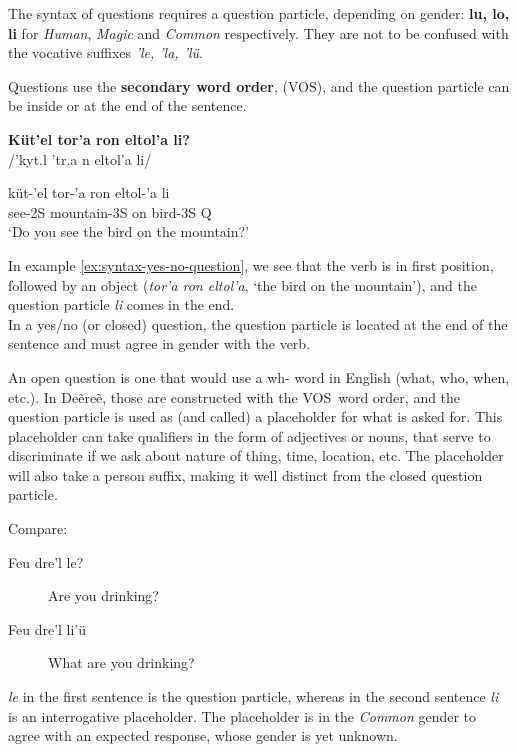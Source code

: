 The syntax of questions requires a question particle, depending on gender:
\textbf{lu, lo, li} for \emph{Human}, \emph{Magic} and \emph{Common} respectively.
They are not to be confused with the vocative suffixes \emph{’le, ’la, ’lü}.

Questions use the \textbf{secondary word order}, (VOS), and the question particle can be inside or at the end of the sentence.


\begin{exe}
\ex\label{ex:syntax-yes-no-question}
\textbf{Küt’el tor’a ron eltol’a li?}\\
/'kyt.{\ipaE}l 't{\ipaO\ipaR}r.a {\ipaR\ipaO}n eltol’a li/

\gll küt-’el tor-’a ron eltol-’a li\\
see-2S mountain-3S on bird-3S Q\\
\trans ‘Do you see the bird on the mountain?’
\end{exe}

In example \ref{ex:syntax-yes-no-question}, we see that the verb is in first position,
followed by an object (\emph{tor’a ron eltol’a}, ‘the bird on the mountain’),
and the question particle \emph{li} comes in the end.\\

In a yes/no (or closed) question, the question particle is located at the end of the sentence and must agree in gender with the verb.

An open question is one that would use a wh- word in English (what, who, when, etc.).
In Deẽreẽ, those are constructed with the VOS word order, and the question particle is used as (and called) a placeholder for what is asked for.
This placeholder can take qualifiers in the form of adjectives or nouns, that serve to discriminate if we ask about nature of thing, time, location, etc.
The placeholder will also take a person suffix, making it well distinct from the closed question particle.

Compare:

\begin{description}
\item[Feu dre’l le?] Are you drinking?
\item[Feu dre’l li’ü] What are you drinking?
\end{description}

\emph{le} in the first sentence is the question particle, whereas in the second sentence \emph{li} is an interrogative placeholder.
The placeholder is in the \emph{Common} gender to agree with an expected response, whose gender is yet unknown.

